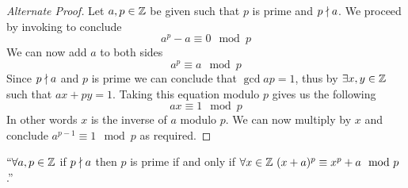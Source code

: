         \begin{proof}[Alternate Proof]
            Let $a, p \in \mathbb{Z}$ be given such that $p$ is prime and $p \nmid a$.
            We proceed by invoking  to conclude
            \[
                a^p - a \equiv 0 \mod p
            \]
            We can now add $a$ to both sides
            \begin{equation}
                a^p \equiv a \mod p
                \label{fermat equation}
            \end{equation}
            Since $p \nmid a$ and $p$ is prime we can conclude that $\gcd{a}{p} = 1$,
            thus by  $\exists x, y \in \mathbb{Z}$ such that
            $ax + py = 1$. Taking this equation modulo $p$ gives us the following
            \[
                ax \equiv 1 \mod p
            \]
            In other words $x$ is the inverse of $a$ modulo $p$. We can now multiply
             by $x$ and conclude $a^{p - 1} \equiv 1 \mod p$
            as required. \QED
        \end{proof}
        \begin{theorem}
            $``\forall a, p \in \mathbb{Z}$ if $p \nmid a$ then
            $p$ is prime if and only if $\forall x \in \mathbb{Z} \ (x + a)^p \equiv x^p + a \mod p$.''
        \end{theorem}
